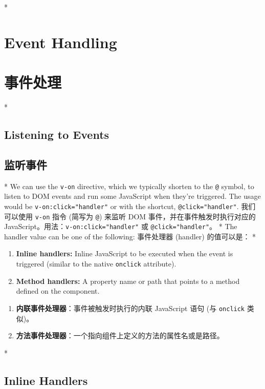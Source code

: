 \begin{paracol}{2}

\switchcolumn[0]*%
\section{Event Handling}
\switchcolumn
\section{事件处理}
\switchcolumn[0]*%
\subsection{Listening to Events}
\switchcolumn
\subsection{监听事件}
\switchcolumn[0]*%
We can use the \texttt{v-on} directive, which we typically shorten to
the \texttt{@} symbol, to listen to DOM events and run some JavaScript
when they're triggered. The usage would be \texttt{v-on:click="handler"}
or with the shortcut, \texttt{@click="handler"}.
\switchcolumn
我们可以使用 \texttt{v-on} 指令 (简写为 \texttt{@}) 来监听 DOM
事件，并在事件触发时执行对应的
JavaScript。用法：\texttt{v-on:click="handler"} 或
\texttt{@click="handler"}。
\switchcolumn[0]*%
The handler value can be one of the following:
\switchcolumn
事件处理器 (handler) 的值可以是：
\switchcolumn[0]*%
\begin{enumerate}
\def\labelenumi{\arabic{enumi}.}
\item
    \textbf{Inline handlers:} Inline JavaScript to be executed when the
    event is triggered (similar to the native \texttt{onclick} attribute).
\item
    \textbf{Method handlers:} A property name or path that points to a
    method defined on the component.
\end{enumerate}
\switchcolumn
\begin{enumerate}
\def\labelenumi{\arabic{enumi}.}
\item
    \textbf{内联事件处理器}：事件被触发时执行的内联 JavaScript 语句 (与
    \texttt{onclick} 类似)。
\item
    \textbf{方法事件处理器}：一个指向组件上定义的方法的属性名或是路径。
\end{enumerate}
\switchcolumn[0]*%
\subsection{Inline Handlers}
\switchcolumn

\end{paracol}
